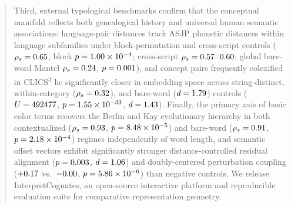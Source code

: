 \begin{abstract}
Third, external typological benchmarks confirm that the conceptual manifold reflects both genealogical history and universal human semantic associations: language-pair distances track ASJP phonetic distances within language subfamilies under block-permutation and cross-script controls ($\rho_s = \MantelWithinSubfamilyRho$, block $p = \MantelWithinSubfamilyBlockP$; cross-script $\rho_s = \MantelCrossScriptSubfamilyRho$--$\MantelBareCrossScriptSubfamilyRho$; global bare-word Mantel $\rho_s = \MantelBareRho$, $p = \MantelBareP$), and concept pairs frequently colexified in CLICS\textsuperscript{3} lie significantly closer in embedding space across string-distinct, within-category ($\rho_s = \ColexWithinCatRho$), and bare-word ($d = \ColexBareStringDistinctCohenD$) controls ($U = \ColexU$, $p = \ColexP$, $d = \ColexCohenD$).
Finally, the primary axis of basic color terms recovers the Berlin and Kay evolutionary hierarchy in both contextualized ($\rho_s = \ColorBKRho$, $p = \ColorBKP$) and bare-word ($\rho_s = \ColorBareBKRho$, $p = \ColorBareBKP$) regimes independently of word length, and semantic offset vectors exhibit significantly stronger distance-controlled residual alignment ($p = \OffsetResidP$, $d = \OffsetResidCohenD$) and doubly-centered perturbation coupling ($+\OffsetCouplingSemanticMean$ vs.\ $\OffsetCouplingControlMean$, $p = \OffsetCouplingP$) than negative controls.
We release InterpretCognates, an open-source interactive platform and reproducible evaluation suite for comparative representation geometry.
\end{abstract}
